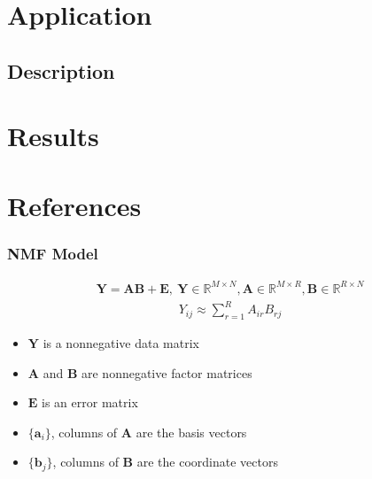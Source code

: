 \documentclass{beamer}
\begin{document}
\section{Application}
\subsection{Description}

\section{Results}
\section{References}

\begin{frame}
\frametitle{NMF Model}
\begin{align*}
\mathbf{Y} = \mathbf{A}\mathbf{B} + \mathbf{E}, \ \mathbf{Y}  \in \mathbb{R}^{M \times N}, \mathbf{A}  \in \mathbb{R}^{M \times R}, \mathbf{B}  \in \mathbb{R}^{R \times N}
\end{align*}
\begin{align*}
Y_{ij} \approx \sum_{r=1}^{R} A_{ir} B_{rj} 
\end{align*}

\begin{itemize}
\item  $\mathbf{Y}$ is a nonnegative data matrix
\item  $\mathbf{A}$ and $\mathbf{B}$ are nonnegative factor matrices
\item  $\mathbf{E}$ is an error matrix
\item  $\{\mathbf{a}_i\}$, columns of $\mathbf{A}$ are the basis vectors
\item  $\{\mathbf{b}_j\}$, columns of $\mathbf{B}$ are the coordinate vectors
\end{itemize}
\end{frame}
\end{document}

